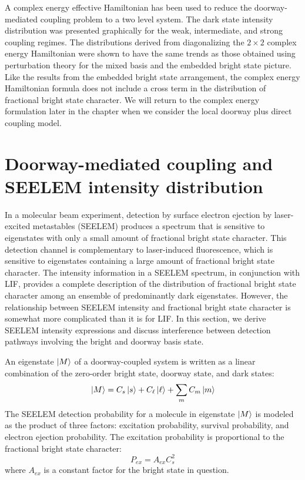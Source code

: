 \documentclass[12pt]{mitthesis}
\begin{document}
A complex energy effective Hamiltonian has been used to reduce the
doorway-mediated coupling problem to a two level system. The dark
state intensity distribution was presented graphically for the weak,
intermediate, and strong coupling regimes. The distributions derived
from diagonalizing the $2 \times 2$ complex energy Hamiltonian were
shown to have the same trends as those obtained using perturbation
theory for the mixed basis and the embedded bright state picture.
Like the results from the embedded bright state arrangement, the
complex energy Hamiltonian formula does not include a cross term in
the distribution of fractional bright state character.  We will return
to the complex energy formulation later in the chapter when we
consider the local doorway plus direct coupling model.


\section{Doorway-mediated coupling and SEELEM intensity distribution}
\label{sec:seelem-intensity}

In a molecular beam experiment, detection by surface electron ejection
by laser-excited metastables (SEELEM) produces a spectrum that is
sensitive to eigenstates with only a small amount of fractional bright
state character.  This detection channel is complementary to
laser-induced fluorescence, which is sensitive to eigenstates
containing a large amount of fractional bright state character.  The
intensity information in a SEELEM spectrum, in conjunction with LIF,
provides a complete description of the distribution of fractional
bright state character among an ensemble of predominantly dark
eigenstates. However, the relationship between SEELEM intensity and
fractional bright state character is somewhat more complicated than it
is for LIF.  In this section, we derive SEELEM intensity expressions
and discuss interference between detection pathways involving the
bright and doorway basis state.

An eigenstate $\mathinner{|{M}\rangle}$ of a doorway-coupled system is written as a
linear combination of the zero-order bright state, doorway state, and
dark states:
\begin{equation}
  \mathinner{|{M}\rangle} = C_s \mathinner{|{s}\rangle} + C_{\ell} \mathinner{|{\ell}\rangle} + \sum_m C_m \mathinner{|{m}\rangle}
\end{equation}
The SEELEM detection probability for a molecule in eigenstate
$\mathinner{|{M}\rangle}$ is modeled as the product of three factors: excitation
probability, survival probability, and electron ejection
probability. The excitation probability is proportional to the
fractional bright state character:
\begin{equation}
  P_{ex} = A_{ex} C_s^2
\end{equation}
where $A_{ex}$ is a constant factor for the bright state in question.
\end{document}

